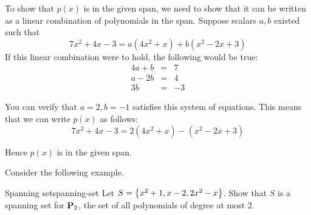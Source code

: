 \begin{solution}
  To show that $p(x)$ is in the given span, we need to
  show that it can be written as a linear combination of polynomials in
  the span. Suppose scalars $a, b$ existed such that
  \begin{equation*}
    7x^2 +4x - 3= a(4x^2+x) + b (x^2-2x+3)
  \end{equation*}
  If this linear combination were to hold, the
  following would be true:
  \begin{eqnarray*}
    4a + b &=& 7 \\
    a - 2b &=& 4 \\
    3b &=& -3
  \end{eqnarray*}

  You can verify that $a = 2, b = -1$ satisfies this system of
  equations. This means that we can write $p(x)$ as follows:
  \begin{equation*}
    7x^2 +4x-3= 2(4x^2+x) - (x^2-2x+3)
  \end{equation*}

  Hence $p(x)$ is in the given span.
\end{solution}

Consider the following example.

\begin{example}{Spanning set}{spanning-set}
  Let $S = \left\{x^2 + 1,
    x-2, 2x^2 - x \right\}$. Show that $S$ is a spanning set for $\mathbf{P}_2$, the
  set of all polynomials of degree at most $2$.
\end{example}

